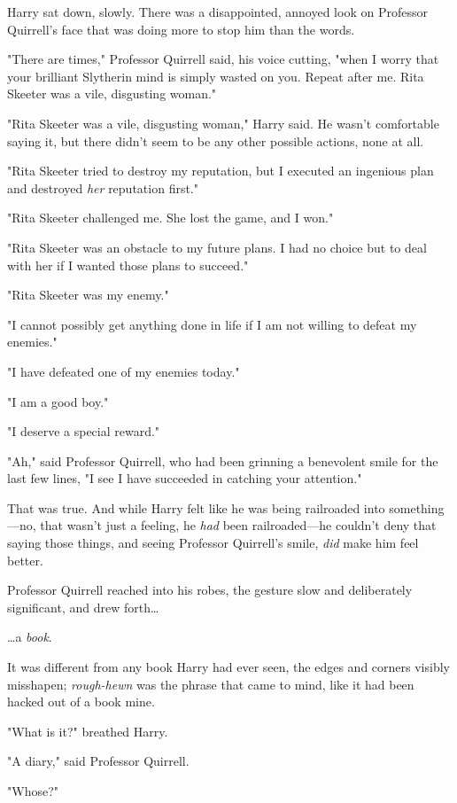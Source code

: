 Harry sat down, slowly. There was a disappointed, annoyed look on Professor
Quirrell's face that was doing more to stop him than the words.

"There are times," Professor Quirrell said, his voice cutting, "when I worry
that your brilliant Slytherin mind is simply wasted on you. Repeat after me.
Rita Skeeter was a vile, disgusting woman."

"Rita Skeeter was a vile, disgusting woman," Harry said. He wasn't comfortable
saying it, but there didn't seem to be any other possible actions, none at all.

"Rita Skeeter tried to destroy my reputation, but I executed an ingenious plan
and destroyed \emph{her} reputation first."

"Rita Skeeter challenged me. She lost the game, and I won."

"Rita Skeeter was an obstacle to my future plans. I had no choice but to deal
with her if I wanted those plans to succeed."

"Rita Skeeter was my enemy."

"I cannot possibly get anything done in life if I am not willing to defeat my
enemies."

"I have defeated one of my enemies today."

"I am a good boy."

"I deserve a special reward."

"Ah," said Professor Quirrell, who had been grinning a benevolent smile for the
last few lines, "I see I have succeeded in catching your attention."

That was true. And while Harry felt like he was being railroaded into
something---no, that wasn't just a feeling, he \emph{had} been railroaded---he
couldn't deny that saying those things, and seeing Professor Quirrell's smile,
\emph{did} make him feel better.

Professor Quirrell reached into his robes, the gesture slow and deliberately
significant, and drew forth{\ldots}

{\ldots}a \emph{book}.

It was different from any book Harry had ever seen, the edges and corners
visibly misshapen; \emph{rough-hewn} was the phrase that came to mind, like it
had been hacked out of a book mine.

"What is it?" breathed Harry.

"A diary," said Professor Quirrell.

"Whose?"

